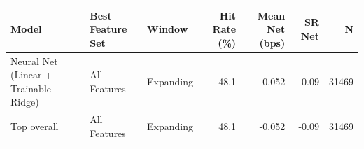 \begin{tabular}{lllrrrr}
\toprule
Model & Best Feature Set & Window & Hit Rate (\%) & Mean Net (bps) & SR Net & N \\
\midrule
Neural Net (Linear + Trainable Ridge) & All Features & Expanding & 48.1 & -0.052 & -0.09 & 31469 \\
\midrule
Top overall & All Features & Expanding & 48.1 & -0.052 & -0.09 & 31469 \\
\bottomrule
\end{tabular}
